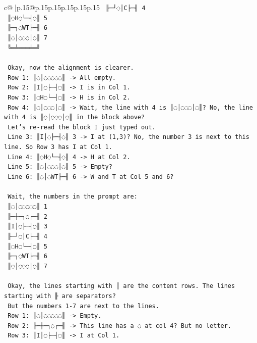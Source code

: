 \documentclass{article}
\begin{document}
{\begin{supertabular}{c@{$\;$}|p{.15\linewidth}@{}p{.15\linewidth}p{.15\linewidth}p{.15\linewidth}p{.15\linewidth}p{.15\linewidth}}
{{{\texttt{   ╟─┘◌│C├─╢ 4} \\
\texttt{   ║◌H◌└─┤◌║ 5} \\
\texttt{   ╟─┐◌WT├─╢ 6} \\
\texttt{   ║◌│◌◌◌│◌║ 7} \\
\texttt{   ╚═╧═══╧═╝} \\
\\ 
\texttt{   Okay, now the alignment is clearer.} \\
\texttt{   Row 1: ║◌│◌◌◌◌◌║ {-}> All empty.} \\
\texttt{   Row 2: ║I│◌├─┤◌║ {-}> I is in Col 1.} \\
\texttt{   Row 3: ║◌H◌└─┤◌║ {-}> H is in Col 2.} \\
\texttt{   Row 4: ║◌│◌◌◌│◌║ {-}> Wait, the line with 4 is ║◌│◌◌◌│◌║? No, the line with 4 is ║◌│◌◌◌│◌║ in the block above?} \\
\texttt{   Let's re{-}read the block I just typed out.} \\
\texttt{   Line 3: ║I│◌├─┤◌║ 3 {-}> I at (1,3)? No, the number 3 is next to this line. So Row 3 has I at Col 1.} \\
\texttt{   Line 4: ║◌H◌└─┤◌║ 4 {-}> H at Col 2.} \\
\texttt{   Line 5: ║◌│◌◌◌│◌║ 5 {-}> Empty?} \\
\texttt{   Line 6: ║◌│◌WT├─╢ 6 {-}> W and T at Col 5 and 6?} \\
\\ 
\texttt{   Wait, the numbers in the prompt are:} \\
\texttt{   ║◌│◌◌◌◌◌║ 1} \\
\texttt{   ╟─┼─┐◌┌─╢ 2} \\
\texttt{   ║I│◌├─┤◌║ 3} \\
\texttt{   ╟─┘◌│C├─╢ 4} \\
\texttt{   ║◌H◌└─┤◌║ 5} \\
\texttt{   ╟─┐◌WT├─╢ 6} \\
\texttt{   ║◌│◌◌◌│◌║ 7} \\
\\ 
\texttt{   Okay, the lines starting with ║ are the content rows. The lines starting with ╟ are separators?} \\
\texttt{   But the numbers 1{-}7 are next to the lines.} \\
\texttt{   Row 1: ║◌│◌◌◌◌◌║ {-}> Empty.} \\
\texttt{   Row 2: ╟─┼─┐◌┌─╢ {-}> This line has a ◌ at col 4? But no letter.} \\
\texttt{   Row 3: ║I│◌├─┤◌║ {-}> I at Col 1.} \\
}}}
\end{supertabular}}
\end{document}
